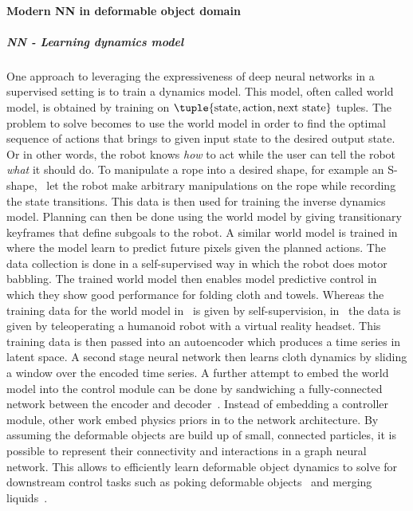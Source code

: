 \documentclass[\home/main.tex]{subfiles}
\begin{document}
\paragraph{Modern NN in deformable object domain}

\subparagraph{NN - Learning dynamics model}
One approach to leveraging the expressiveness of deep neural networks in a supervised setting is to train a dynamics model. This  model, often called world model, is obtained by training on $\tuple{\text{state}, \text{action}, \text{next state}}$ tuples. The problem to solve becomes to use the world model in order to find the optimal sequence of actions that brings to given input state to the desired output state. Or in other words, the robot knows \textit{how} to act while the user can tell the robot \textit{what} it should do. To manipulate a rope into a desired shape, for example an S-shape,~\autocite{Nair2017} let the robot make arbitrary manipulations on the rope while recording the state transitions. This data is then used for training the inverse dynamics model. Planning can then be done using the world model by giving transitionary keyframes that define subgoals to the robot. A similar world model is trained in~\autocite{Ebert2018} where the model learn to predict future pixels given the planned actions. The data collection is done in a self-supervised way in which the robot does motor babbling. The trained world model then enables model predictive control in which they show good performance for folding cloth and towels. Whereas the training data for the world model in~\autocite{Nair2017} is given by self-supervision, in~\autocite{Yang2016} the data is given by teleoperating a humanoid robot with a virtual reality headset. This training data is then passed into an autoencoder which produces a time series in latent space. A second stage neural network then learns cloth dynamics by sliding a window over the encoded time series. A further attempt to embed the world model into the control module can be done by sandwiching a fully-connected network between the encoder and decoder~\autocite{Tanaka2018}. Instead of embedding a controller module, other work embed physics priors in to the network architecture. By assuming the deformable objects are build up of small, connected particles, it is possible to represent their connectivity and interactions in a graph neural network. This allows to efficiently learn deformable object dynamics to solve for downstream control tasks such as poking deformable objects~\autocite{Mrowca2018} and merging liquids~\autocite{Li2018}.
\end{document}
